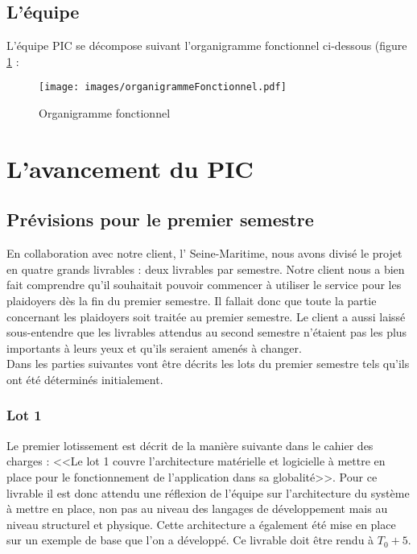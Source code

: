 \documentclass[asi]{picInsa}
\begin{document}
\section{L'équipe}
L'équipe PIC se décompose suivant l'organigramme fonctionnel ci-dessous (figure \ref{organigramme} :
\begin{figure}[!h]
	\begin{center}
	\texttt{[image: images/organigrammeFonctionnel.pdf]}
	\label{organigramme}
	\caption{Organigramme fonctionnel}
	\end{center}
\end{figure} 





\chapter{L'avancement du PIC}
\label{avancement}
\section{Prévisions pour le premier semestre}
En collaboration avec notre client, l'\nomClient{} Seine-Maritime, nous avons divisé le projet en quatre grands livrables : deux livrables par semestre. Notre client nous a bien fait comprendre qu'il souhaitait pouvoir commencer à utiliser le service pour les plaidoyers dès la fin du premier semestre. Il fallait donc que toute la partie concernant les plaidoyers soit traitée au premier semestre. Le client a aussi laissé sous-entendre que les livrables attendus au second semestre n'étaient pas les plus importants à leurs yeux et qu'ils seraient amenés à changer.\vspace{0.5cm}\\
Dans les parties suivantes vont être décrits les lots du premier semestre tels qu'ils ont été déterminés initialement.

\subsection{Lot 1}
Le premier lotissement est décrit de la manière suivante dans le cahier des charges : <<Le lot 1 couvre l'architecture matérielle et logicielle à mettre en place pour le fonctionnement de l'application dans sa globalité>>. Pour ce livrable il est donc attendu une réflexion de l'équipe sur l'architecture du système à mettre en place, non pas au niveau des langages de développement mais au niveau structurel et physique. Cette architecture a également été mise en place sur un exemple de base que l'on a développé. Ce livrable doit être rendu à $T_{0}+5$. 
\end{document}
